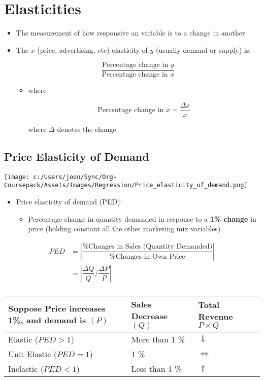 \documentclass[10pt,article]{article}
\begin{document}
\section{Elasticities}
\label{sec:orgdca80a3}
\begin{itemize}
\item The measurement of how responsive an variable is to a change in another

\item The \(x\) (price, advertising, etc) elasticity of \(y\) (usually
demand or supply) is:

\[ \dfrac{\text{Percentage change in } y}{\text{Percentage change in } x} \]

\begin{itemize}
\item where

\[ \text{Percentage change in } x= \dfrac{\Delta x}{x} \]

where \(\Delta\) denotes the change
\end{itemize}
\end{itemize}
\subsection{Price Elasticity of Demand}
\label{sec:org8449561}
\begin{center}
\texttt{[image: c:/Users/joon/Sync/Org-Coursepack/Assets/Images/Regression/Price\_elasticity\_of\_demand.png]}
\end{center}

\begin{itemize}
\item Price elasticity of demand (PED): 
\begin{itemize}
\item Percentage change in quantity demanded in response to a \textbf{1\% change} in
price (holding constant all the other marketing mix variables)
\end{itemize}
\end{itemize}

\begin{align*}
   PED & = \left\lvert \dfrac{\% \text{Changes in Sales (Quantity Demanded)}}{\% \text{Changes in Own Price}} \right\rvert \\
       & = \left\lvert \dfrac {\Delta Q}{Q} \Bigg/ \dfrac {\Delta P}{P} \right\rvert   \\
\end{align*}

\begin{center}
\begin{tabular}{lll}
Suppose Price increases 1\%, and demand is \((P)\) & Sales Decrease \((Q)\) & Total Revenue \(P \times Q\)\\
\hline
 Elastic (\( PED > 1 \)) &  More than 1 \% &  \( \Downarrow \)\\
 Unit Elastic (\( PED = 1 \)) &  1 \% &  \( \Longleftrightarrow \)\\
 Inelastic (\( PED < 1 \)) &  Less than 1 \% &  \( \Uparrow \)\\
\end{tabular}
\end{center}
\end{document}
